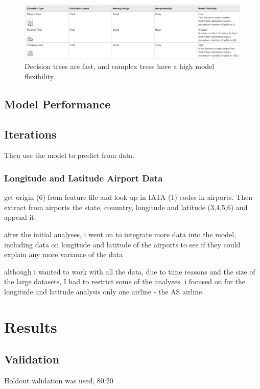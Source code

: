 \documentclass[a4paper, 11pt]{article}
\begin{document}
\begin{figure}[H]
\begin{center}
\includegraphics[scale=0.5]{decisiontrees}
\caption{Decision trees are fast, and complex trees have a high model flexibility.}
\label{decisiontrees}
\end{center}
\end{figure}


\subsection{Model Performance}
\subsection{Iterations}

Then use the model to predict from data.

\subsubsection{Longitude and Latitude Airport Data}
get origin (6) from feature file and look up in IATA (1) codes in airports. Then extract from airports the state, couuntry, longitude and latitude (3,4,5,6) and append it.

after the initial analyses, i went on to integrate more data into the model, including data on longitude and latitude of the airports to see if they could explain any more variance of the data

although i wanted to work with all the data, due to time reasons and the size of the large datasets, I had to restrict some of the analyses. i focused on for the longitude and latitude analysis only one airline - the AS airline.


\section{Results}

\subsection{Validation}
Holdout validation was used, 80:20
\end{document}
